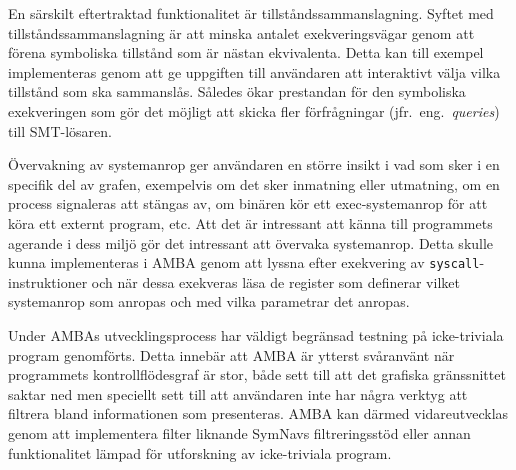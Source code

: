 En särskilt eftertraktad funktionalitet är tillståndssammanslagning. Syftet med
tillståndssammanslagning är att minska antalet exekveringsvägar genom att förena
symboliska tillstånd som är nästan ekvivalenta. Detta kan till exempel
implementeras genom att ge uppgiften till användaren att interaktivt välja vilka
tillstånd som ska sammanslås. Således ökar prestandan för den symboliska
exekveringen som gör det möjligt att skicka fler förfrågningar (jfr.\ eng.\
\emph{queries}) till SMT-lösaren.

Övervakning av systemanrop ger användaren en
större insikt i vad som sker i en specifik del av grafen, exempelvis om det sker
inmatning eller utmatning, om en process signaleras att stängas av, om binären
kör ett exec-systemanrop för att köra ett externt program, etc. Att det är
intressant att känna till programmets agerande i dess miljö gör det intressant
att övervaka systemanrop. Detta skulle kunna implementeras i AMBA genom att
lyssna efter exekvering av \texttt{syscall}-instruktioner och när dessa
exekveras läsa de register som definerar vilket systemanrop som anropas och med
vilka parametrar det anropas.

Under AMBAs utvecklingsprocess har väldigt begränsad testning på icke-triviala
program genomförts. Detta innebär att AMBA är ytterst svåranvänt när programmets
kontrollflödesgraf är stor, både sett till att det grafiska gränssnittet saktar
ned men speciellt sett till att användaren inte har några verktyg att filtrera
bland informationen som presenteras. AMBA kan därmed vidareutvecklas genom att
implementera filter liknande SymNavs filtreringsstöd eller annan funktionalitet
lämpad för utforskning av icke-triviala program.

